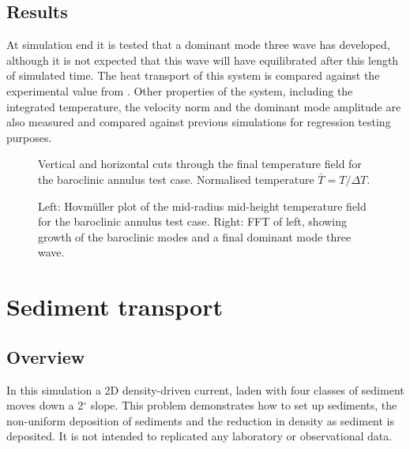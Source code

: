 \subsection{Results}

At simulation end it is tested that a dominant mode three wave has developed,
although it is not expected that this wave will have equilibrated after this
length of simulated time. The heat transport of this system is compared against the experimental
value from \citet{read2003}. Other properties of the system, including the integrated
temperature, the velocity \Ltwo norm and the dominant mode amplitude
are also measured and compared against previous simulations
for regression testing purposes.

\begin{figure}[ht]
  \centering
  \caption{Vertical and horizontal cuts through the final temperature field
           for the baroclinic annulus test case. Normalised temperature
           $\bar{T} = T / \Delta T$.}
  \label{fig:lock_exchange}
\end{figure}

\begin{figure}[ht]
  \centering
  \caption{Left: Hovm\"uller plot of the mid-radius mid-height temperature field
           for the baroclinic annulus test case. Right: FFT of left, showing
           growth of the baroclinic modes and a final dominant mode three wave.}
  \label{fig:lock_exchange}
\end{figure}


\section{Sediment transport}
\label{sect:sediment_transport}

\subsection{Overview}

In this simulation a 2D density-driven current, laden with four classes of sediment
moves down a 2$^{\circ}$ slope. This problem demonstrates how to set up sediments, 
the non-uniform deposition of sediments and the reduction in density as sediment is
deposited. It is not intended to replicated any laboratory or observational data.

